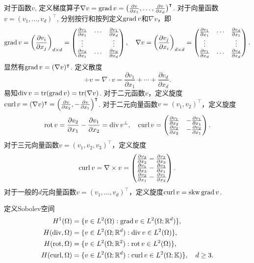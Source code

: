 对于函数$v$, 定义梯度算子$\nabla v=\operatorname{grad} v=\big(\frac{\partial v}{\partial x_1}, \ldots, \frac{\partial v}{\partial x_d}\big)^{\intercal}$.
对于向量函数$v=(v_1, \ldots, v_d)^{\intercal}$, 分别按行和按列定义$\operatorname{grad} v$和$\nabla v$，即
$$
\operatorname{grad} v=\left(\frac{\partial v_i}{\partial x_j}\right)_{d\times d}=\begin{pmatrix}
\frac{\partial v_1}{\partial x_1} & \cdots & \frac{\partial v_1}{\partial x_d} \\
\vdots &  & \vdots \\
\frac{\partial v_d}{\partial x_1} & \cdots & \frac{\partial v_d}{\partial x_d} 
\end{pmatrix},\quad \nabla v=\left(\frac{\partial v_j}{\partial x_i}\right)_{d\times d}=\begin{pmatrix}
\frac{\partial v_1}{\partial x_1} & \cdots & \frac{\partial v_d}{\partial x_1} \\
\vdots &  & \vdots \\
\frac{\partial v_1}{\partial x_d} & \cdots & \frac{\partial v_d}{\partial x_d} 
\end{pmatrix}.
$$
显然有$\operatorname{grad} v=(\nabla v)^{\intercal}$. 定义散度
$$
\div v=\nabla \cdot v=\frac{\partial v_1}{\partial x_1}+\cdots+\frac{\partial v_d}{\partial x_d}.
$$
易知$\operatorname{div} v=\operatorname*{tr}(\operatorname{grad} v)=\operatorname*{tr}(\nabla v)$. 对于二元函数$v$，定义旋度$\operatorname{curl} v=(\nabla v)^{\intercal}=\left(\frac{\partial v}{\partial x_2}, -\frac{\partial v}{\partial x_1}\right)^{\intercal}$. 对于二元向量函数$v=(v_1, v_2)^{\intercal}$，定义旋度
$$
\operatorname{rot} v=\frac{\partial v_2}{\partial x_1}-\frac{\partial v_1}{\partial x_2}=\operatorname{div} v^{\perp},\quad \operatorname{curl} v=\begin{pmatrix}
\frac{\partial v_1}{\partial x_2} & -\frac{\partial v_1}{\partial x_1} \\
\frac{\partial v_2}{\partial x_2} & -\frac{\partial v_2}{\partial x_1}
\end{pmatrix}.
$$
对于三元向量函数$v=(v_1, v_2, v_3)^{\intercal}$，定义旋度
$$
\operatorname{curl} v=\nabla\times v=\begin{pmatrix}
\frac{\partial v_3}{\partial x_2} - \frac{\partial v_2}{\partial x_3} \\
\frac{\partial v_1}{\partial x_3} - \frac{\partial v_3}{\partial x_1} \\
\frac{\partial v_2}{\partial x_1} - \frac{\partial v_1}{\partial x_2}
\end{pmatrix}.
$$
对于一般的$d$元向量函数$v=(v_1, \ldots, v_d)^{\intercal}$，定义旋度$\operatorname{curl} v=\operatorname{skw}\operatorname{grad} v$.


定义Sobolev空间
\begin{align*}
H^1(\Omega) &=\{v\in L^2(\Omega): \operatorname{grad} v\in L^2(\Omega;\mathbb R^d)\}, \\
H(\operatorname{div}, \Omega) &=\{v\in L^2(\Omega;\mathbb R^d): \operatorname{div} v\in L^2(\Omega)\}, \\
H(\operatorname{rot}, \Omega) &=\{v\in L^2(\Omega;\mathbb R^2): \operatorname{rot} v\in L^2(\Omega)\}, \\
H(\operatorname{curl}, \Omega) &=\{v\in L^2(\Omega;\mathbb R^d): \operatorname{curl} v\in L^2(\Omega;\mathbb K)\}, \quad d\geq3.
\end{align*}

